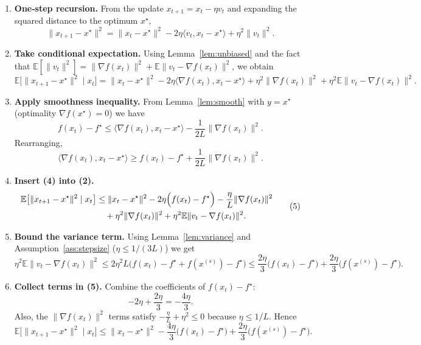 \documentclass{article}
\newcommand{\E}{\mathbb{E}}
\begin{document}
\begin{enumerate}[label=[Step \arabic*]]
\item \textbf{One‑step recursion.}  
From the update $x_{t+1}=x_t-\eta v_t$ and expanding the squared distance to the optimum $x^\star$,
\[
\|x_{t+1}-x^\star\|^2
= \|x_t-x^\star\|^2-2\eta\langle v_t,x_t-x^\star\rangle+\eta^2\|v_t\|^2 .
\tag{1}
\]

\item \textbf{Take conditional expectation.}  
Using Lemma~\ref{lem:unbiased} and the fact that $\E[\|v_t\|^2]=\|\nabla f(x_t)\|^2+\E\|v_t-\nabla f(x_t)\|^2$, we obtain
\[
\E\bigl[\|x_{t+1}-x^\star\|^2\mid x_t\bigr]
= \|x_t-x^\star\|^2-2\eta\langle \nabla f(x_t),x_t-x^\star\rangle
   +\eta^2\|\nabla f(x_t)\|^2+\eta^2\E\|v_t-\nabla f(x_t)\|^2 .
\tag{2}
\]

\item \textbf{Apply smoothness inequality.}  
From Lemma~\ref{lem:smooth} with $y=x^\star$ (optimality $\nabla f(x^\star)=0$) we have
\[
f(x_t)-f^\star\le \langle \nabla f(x_t),x_t-x^\star\rangle-\frac{1}{2L}\|\nabla f(x_t)\|^2 .
\tag{3}
\]
Rearranging,
\[
\langle \nabla f(x_t),x_t-x^\star\rangle
\ge f(x_t)-f^\star+\frac{1}{2L}\|\nabla f(x_t)\|^2 .
\tag{4}
\]

\item \textbf{Insert (4) into (2).}  
\[
\begin{aligned}
\E\bigl[\|x_{t+1}-x^\star\|^2\mid x_t\bigr]
&\le \|x_t-x^\star\|^2-2\eta\Bigl(f(x_t)-f^\star\Bigr)
   -\frac{\eta}{L}\|\nabla f(x_t)\|^2   \\
&\quad +\eta^2\|\nabla f(x_t)\|^2
   +\eta^2\E\|v_t-\nabla f(x_t)\|^2 .
\end{aligned}
\tag{5}
\]

\item \textbf{Bound the variance term.}  
Using Lemma~\ref{lem:variance} and Assumption~\ref{ass:stepsize} ($\eta\le 1/(3L)$) we get
\[
\eta^2\E\|v_t-\nabla f(x_t)\|^2
\le 2\eta^2L\bigl(f(x_t)-f^\star+f(x^{(s)})-f^\star\bigr)
\le \frac{2\eta}{3}\bigl(f(x_t)-f^\star\bigr)
   +\frac{2\eta}{3}\bigl(f(x^{(s)})-f^\star\bigr) .
\tag{6}
\]

\item \textbf{Collect terms in (5).}  
Combine the coefficients of $f(x_t)-f^\star$:
\[
-2\eta + \frac{2\eta}{3}= -\frac{4\eta}{3}.
\]
Also, the $\|\nabla f(x_t)\|^2$ terms satisfy $-\frac{\eta}{L}+\eta^2\le 0$ because $\eta\le 1/L$. Hence
\[
\E\bigl[\|x_{t+1}-x^\star\|^2\mid x_t\bigr]
\le \|x_t-x^\star\|^2-\frac{4\eta}{3}\bigl(f(x_t)-f^\star\bigr)
   +\frac{2\eta}{3}\bigl(f(x^{(s)})-f^\star\bigr) .
\tag{7}
\]


\end{enumerate}
\end{document}
